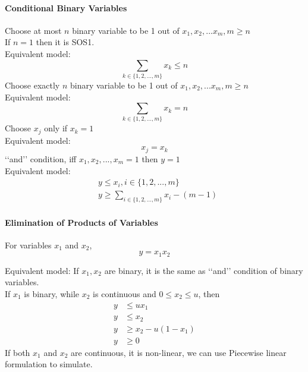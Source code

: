         \paragraph{Conditional Binary Variables}
             Choose at most $n$ binary variable to be 1 out of  $x_1, x_2, ... x_m, m\ge n$\\
            If $n=1$ then it is SOS1.\\
            
            Equivalent model:
            \begin{equation*}
                \sum_{k\in \{1,2,...,m\}} x_k \le n
            \end{equation*}
             Choose exactly $n$ binary variable to be 1 out of  $x_1, x_2, ... x_m, m\ge n$\\
            
            Equivalent model:
            \begin{equation*}
                \sum_{k\in \{1,2,...,m\}} x_k = n
            \end{equation*}
             Choose $x_j$ only if $x_k = 1$\\
            
            Equivalent model:
            \begin{equation*}x_j = x_k  \end{equation*}
             \lq\lq{}and\rq\rq{} condition, iff $x_1, x_2, ... , x_m =1$ then $y=1$\\
            
            Equivalent model:
            \begin{align*}
                & y \le x_i, i\in \{1, 2, ..., m\}  \\
                & y \ge \sum_{i \in \{1, 2, ..., m\}} x_i - (m - 1) 
            \end{align*}

        \paragraph{Elimination of Products of Variables}
             For variables $x_1$ and $x_2$,
            \begin{equation*}y = x_1 x_2\end{equation*}
            
            Equivalent model: If $x_1, x_2$ are binary, it is the same as \lq\lq{}and\rq\rq{} condition of binary variables.\\
            If $x_1$ is binary, while $x_2$ is continuous and $0 \le x_2 \le u$, then
            \begin{align*}
                y &\le ux_1  \\
                y &\le x_2  \\
                y &\ge x_2 - u(1- x_1)  \\
                y &\ge 0 
            \end{align*}
            If both $x_1$ and $x_2$ are continuous, it is non-linear, we can use Piecewise linear formulation to simulate.

